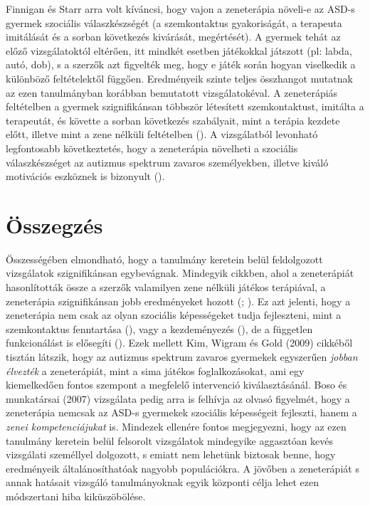 Finnigan és Starr arra volt kíváncsi, hogy vajon a zeneterápia növeli-e az ASD-s gyermek szociális válaszkészségét (a szemkontaktus gyakoriságát, a terapeuta imitálá\-sát és a sorban  következés kivárását, megértését). A gyermek tehát az előző vizsgála\-toktól eltérően, itt mindkét esetben játékokkal játszott (pl: labda, autó, dob), s a szerzők azt figyelték meg, hogy e játék során hogyan viselkedik a különböző feltételektől függően. Eredményeik szinte teljes összhangot mutatnak az ezen tanulmányban korábban bemutatott vizsgálatokéval. A zeneterápiás feltételben a gyermek szignifikánsan többször létesí\-tett szemkontaktust, imitálta a terapeutát, és követte a sorban következés szabályait, mint a terápia kezdete előtt, illetve mint a zene nélküli feltételben (\cite{finnigan_starr_2010}). A vizsgálatból levonható legfontosabb következtetés, hogy a zeneterápia növelheti a szociális válaszkészséget az autizmus spektrum zavaros személyekben, illetve kiváló motivációs eszköznek is bizonyult (\cite{finnigan_starr_2010}).
\pagebreak

\section*{Összegzés}

Összességében elmondható, hogy a tanulmány keretein belül feldolgozott vizsgálatok szignifikánsan egybevágnak. Mindegyik cikkben, ahol a zeneterápiát hasonlították össze a szerzők valamilyen zene nélküli játékos terápiával, a zeneterápia szignifikánsan jobb eredményeket hozott (\cite{finnigan_starr_2010}; \cite{kim_wigram_gold_2009}). Ez azt jelenti, hogy a zeneterápia nem csak az olyan szociális képességeket  tudja fejleszteni, mint a szemkontaktus fenntartása (\cite{finnigan_starr_2010}), vagy a kezdeményezés (\cite{kim_wigram_gold_2009}), de a független funkcionálást is elősegíti (\cite{kern_wolery_aldridge_2006}). Ezek mellett Kim, Wigram és Gold (2009) cikkéből tisztán látszik, hogy az autizmus spektrum zavaros gyermekek egyszerűen \textit{jobban élvezték} a zeneterápiát, mint a sima játékos foglalkozásokat, ami egy kiemelkedően fontos szempont a megfelelő intervenció kiválasztásánál. Boso és munkatársai (2007) vizsgálata pedig arra is felhívja az olvasó figyelmét, hogy a zeneterápia nemcsak az ASD-s gyermekek szociális képességeit fejleszti, hanem a \textit{zenei kompetenciájukat} is. Mindezek ellenére fontos megjegyezni, hogy az ezen tanulmány keretein belül felsorolt vizsgálatok mindegyike aggasztóan kevés vizsgálati személlyel dolgozott, s emiatt nem lehetünk biztosak benne, hogy eredményeik általánosíthatóak nagyobb populációkra. A jövőben a zeneterápiát s annak hatásait vizsgáló tanulmányoknak egyik központi célja lehet ezen módszertani hiba kiküszöbölése.